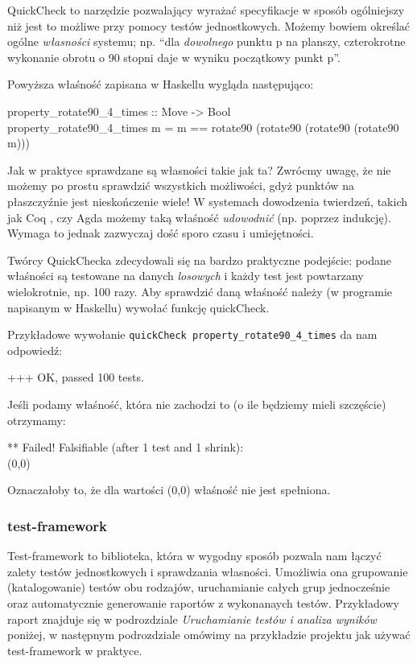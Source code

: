 \documentclass[10pt,leqno]{article}
\newcommand{\cmd}[1]{
  \texttt{#1}
}
\begin{document}
QuickCheck to narzędzie pozwalający wyrażać specyfikacje w sposób ogólniejszy niż 
jest to możliwe przy pomocy testów jednostkowych. Możemy bowiem określać ogólne 
\emph{własności} systemu; np. ``dla \emph{dowolnego} punktu p na planszy, czterokrotne
wykonanie obrotu o 90 stopni daje w wyniku początkowy punkt p''.

Powyższa właśność zapisana w Haskellu wygląda następująco:

\begin{framed}
\noindent property\_rotate90\_4\_times :: Move -> Bool \\
property\_rotate90\_4\_times m = m == rotate90 (rotate90 (rotate90 (rotate90 m))) 
\end{framed}

Jak w praktyce sprawdzane są własności takie jak ta? Zwrócmy uwagę, że nie możemy po
prostu sprawdzić wszystkich możliwości, gdyż punktów na płaszczyźnie jest nieskończenie
wiele! W systemach dowodzenia twierdzeń, takich jak Coq \cite{coq}, czy Agda \cite{agda}
możemy taką właśność \emph{udowodnić} (np. poprzez indukcję). Wymaga to jednak zazwyczaj
dość sporo czasu i umiejętności. 

Twórcy QuickChecka zdecydowali się na bardzo praktyczne podejście: podane właśności są
testowane na danych \emph{losowych} i każdy test jest powtarzany wielokrotnie, np. 100 razy.
Aby sprawdzić daną właśność należy (w programie napisanym w Haskellu) wywołać funkcję quickCheck.

Przykładowe wywołanie \cmd{quickCheck property\_rotate90\_4\_times} da nam odpowiedź:

\begin{framed}
\noindent +++ OK, passed 100 tests.
\end{framed}

Jeśli podamy właśność, która nie zachodzi to (o ile będziemy mieli szczęście) otrzymamy:

\begin{framed}
\noindent *** Failed! Falsifiable (after 1 test and 1 shrink):  \\
(0,0)
\end{framed}

\noindent Oznaczałoby to, że dla wartości (0,0) właśność nie jest spełniona.

\subsubsection{test-framework}

Test-framework to biblioteka, która w wygodny sposób pozwala nam łączyć zalety testów 
jednostkowych i sprawdzania własności. Umożliwia ona grupowanie (katalogowanie) testów 
obu rodzajów, uruchamianie całych grup jednocześnie oraz automatycznie generowanie
raportów z wykonanaych testów. Przykładowy raport znajduje się w podrozdziale 
\emph{Uruchamianie testów i analiza wyników} poniżej, w następnym podrozdziale omówimy
na przykładzie projektu jak używać test-framework w praktyce.
\end{document}
